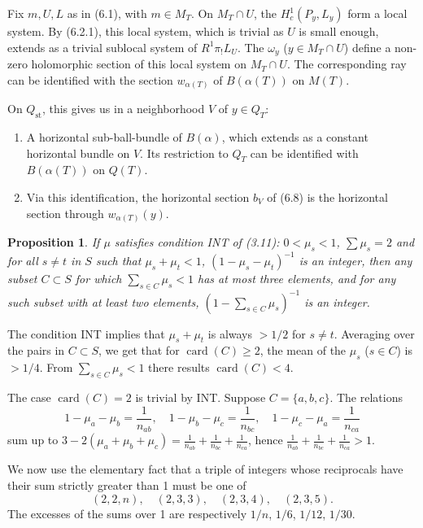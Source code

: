 \documentclass[12pt,a4paper]{article}
\theoremstyle{plain}
\newtheorem{proposition}[theorem]{Proposition}
\theoremstyle{definition}
\theoremstyle{remark}
\DeclareMathOperator{\card}{card}
\numberwithin{equation}{section}
\begin{document}
Fix $m, U, L$ as in (6.1), with $m \in M_T$. On $M_T \cap U$, the $H^1_c(P_y, L_y)$ form a local system. By (6.2.1), this local system, which is trivial as $U$ is small enough, extends as a trivial sublocal system of $R^1\pi_! L_U$. The $\omega_y$ ($y \in M_T \cap U$) define a non-zero holomorphic section of this local system on $M_T \cap U$. The corresponding ray can be identified with the section $w_{\alpha(T)}$ of $B(\alpha(T))$ on $M(T)$.

On $Q_{\mathrm{st}}$, this gives us in a neighborhood $V$ of $y \in Q_T$:
\begin{enumerate}[label=\alph*)]
\item A horizontal sub-ball-bundle of $B(\alpha)$, which extends as a constant horizontal bundle on $V$. Its restriction to $Q_T$ can be identified with $B(\alpha(T))$ on $Q(T)$.
\item Via this identification, the horizontal section $b_V$ of (6.8) is the horizontal section through $w_{\alpha(T)}(y)$.
\end{enumerate}

\begin{proposition}\label{prop:6.10}
If $\mu$ satisfies condition INT of (3.11): $0 < \mu_s < 1$, $\sum \mu_s = 2$ and for all $s \neq t$ in $S$ such that $\mu_s + \mu_t < 1$, $(1 - \mu_s - \mu_t)^{-1}$ is an integer, then any subset $C \subset S$ for which $\sum_{s \in C} \mu_s < 1$ has at most three elements, and for any such subset with at least two elements, $(1 - \sum_{s \in C} \mu_s)^{-1}$ is an integer.
\end{proposition}

The condition INT implies that $\mu_s + \mu_t$ is always $> 1/2$ for $s \neq t$. Averaging over the pairs in $C \subset S$, we get that for $\card(C) \geq 2$, the mean of the $\mu_s$ ($s \in C$) is $> 1/4$. From $\sum_{s \in C} \mu_s < 1$ there results $\card(C) < 4$.

The case $\card(C) = 2$ is trivial by INT. Suppose $C = \{a, b, c\}$. The relations
\[
1 - \mu_a - \mu_b = \frac{1}{n_{ab}}, \quad 1 - \mu_b - \mu_c = \frac{1}{n_{bc}}, \quad 1 - \mu_c - \mu_a = \frac{1}{n_{ca}}
\]
sum up to $3 - 2(\mu_a + \mu_b + \mu_c) = \frac{1}{n_{ab}} + \frac{1}{n_{bc}} + \frac{1}{n_{ca}}$, hence $\frac{1}{n_{ab}} + \frac{1}{n_{bc}} + \frac{1}{n_{ca}} > 1$.

We now use the elementary fact that a triple of integers whose reciprocals have their sum strictly greater than 1 must be one of
\[
(2, 2, n), \quad (2, 3, 3), \quad (2, 3, 4), \quad (2, 3, 5).
\]
The excesses of the sums over 1 are respectively $1/n$, $1/6$, $1/12$, $1/30$.
\end{document}

